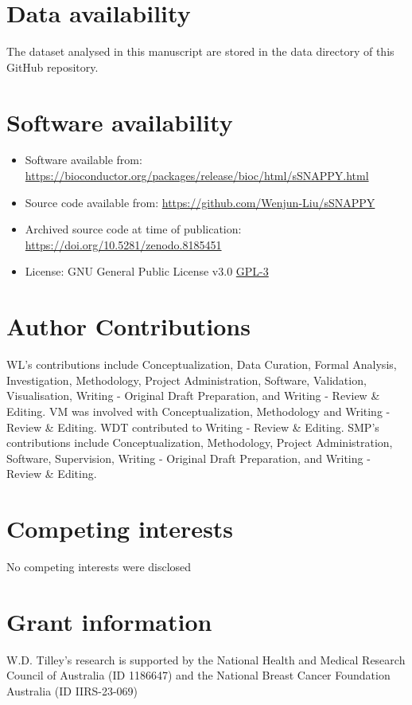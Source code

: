 \documentclass[9pt,a4paper,]{extarticle}
\begin{document}
\hypertarget{data-availability}{%
\section{Data availability}\label{data-availability}}

The dataset analysed in this manuscript are stored in the data directory of this GitHub repository.

\hypertarget{software-availability}{%
\section{Software availability}\label{software-availability}}

\begin{itemize}
\item
  Software available from: \url{https://bioconductor.org/packages/release/bioc/html/sSNAPPY.html}
\item
  Source code available from: \url{https://github.com/Wenjun-Liu/sSNAPPY}
\item
  Archived source code at time of publication: \url{https://doi.org/10.5281/zenodo.8185451}
\item
  License: GNU General Public License v3.0 \href{https://opensource.org/license/gpl-3-0/}{GPL-3}
\end{itemize}

\hypertarget{author-contributions}{%
\section{Author Contributions}\label{author-contributions}}

WL's contributions include Conceptualization, Data Curation, Formal Analysis, Investigation, Methodology, Project Administration, Software, Validation, Visualisation, Writing - Original Draft Preparation, and Writing - Review \& Editing.
VM was involved with Conceptualization, Methodology and Writing - Review \& Editing.
WDT contributed to Writing - Review \& Editing.
SMP's contributions include Conceptualization, Methodology, Project Administration, Software, Supervision, Writing - Original Draft Preparation, and Writing - Review \& Editing.

\hypertarget{competing-interests}{%
\section{Competing interests}\label{competing-interests}}

No competing interests were disclosed

\hypertarget{grant-information}{%
\section{Grant information}\label{grant-information}}

W.D. Tilley's research is supported by the National Health and Medical Research Council of Australia (ID 1186647) and the National Breast Cancer Foundation Australia (ID IIRS-23-069)

\renewcommand\refname{References}
{\small}
\end{document}
